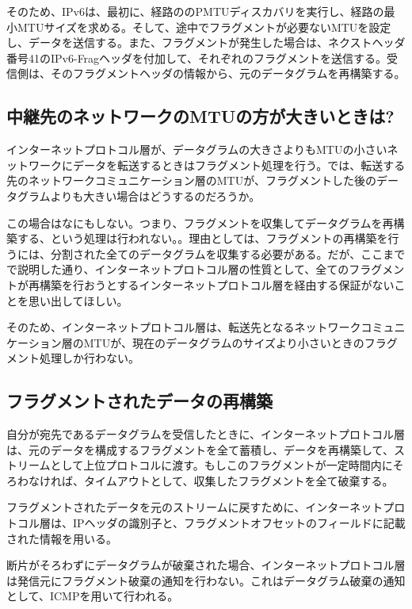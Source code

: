 そのため、IPv6は、最初に、経路ののPMTUディスカバリを実行し、経路の最小MTUサイズを求める。そして、途中でフラグメントが必要ないMTUを設定し、データを送信する。また、フラグメントが発生した場合は、ネクストヘッダ番号41のIPv6-Fragヘッダを付加して、それぞれのフラグメントを送信する。受信側は、そのフラグメントヘッダの情報から、元のデータグラムを再構築する。


\subsection{中継先のネットワークのMTUの方が大きいときは?}

インターネットプロトコル層が、データグラムの大きさよりもMTUの小さいネットワークにデータを転送するときはフラグメント処理を行う。では、転送する先のネットワークコミュニケーション層のMTUが、フラグメントした後のデータグラムよりも大きい場合はどうするのだろうか。

この場合はなにもしない。つまり、フラグメントを収集してデータグラムを再構築する、という処理は行われない。。理由としては、フラグメントの再構築を行うには、分割された全てのデータグラムを収集する必要がある。だが、ここまでで説明した通り、インターネットプロトコル層の性質として、全てのフラグメントが再構築を行おうとするインターネットプロトコル層を経由する保証がないことを思い出してほしい。

そのため、インターネットプロトコル層は、転送先となるネットワークコミュニケーション層のMTUが、現在のデータグラムのサイズより小さいときのフラグメント処理しか行わない。

\subsection{フラグメントされたデータの再構築}

自分が宛先であるデータグラムを受信したときに、インターネットプロトコル層は、元のデータを構成するフラグメントを全て蓄積し、データを再構築して、ストリームとして上位プロトコルに渡す。もしこのフラグメントが一定時間内にそろわなければ、タイムアウトとして、収集したフラグメントを全て破棄する。

フラグメントされたデータを元のストリームに戻すために、インターネットプロトコル層は、IPヘッダの識別子と、フラグメントオフセットのフィールドに記載された情報を用いる。

断片がそろわずにデータグラムが破棄された場合、インターネットプロトコル層は発信元にフラグメント破棄の通知を行わない。これはデータグラム破棄の通知として、ICMPを用いて行われる。

